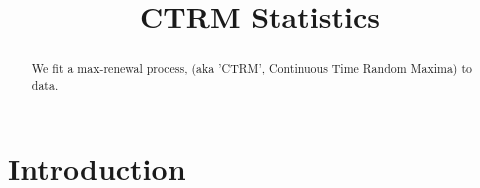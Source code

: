 \documentclass[12pt]{amsart}
\author{ }
\theoremstyle{definition}
\theoremstyle{remark}
\numberwithin{equation}{section}
\newcommand{\1}{\mathbf 1}
\begin{document}

\title{CTRM Statistics}









\begin{abstract}
We fit a max-renewal process, (aka 'CTRM', Continuous Time Random Maxima)
to data. 
\end{abstract}
\maketitle




\section{Introduction}
\end{document}
